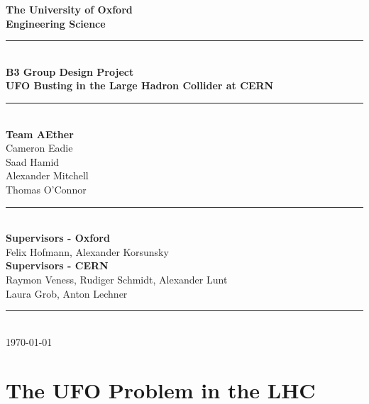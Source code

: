 \documentclass[a4paper,11pt]{report}
\begin{document}

\begin{titlepage}
\begin{center}
\vspace*{1cm}
\Large {\textbf{The University of Oxford}}\\
\Large{\textbf{Engineering Science}}\\
\vfill
\noindent\rule{5in}{0.6pt}\\[1mm]
\huge{\textbf{B3 Group Design Project}}\\[3mm]
\Large{\textbf{UFO Busting in the Large Hadron Collider at CERN}}\\[3mm]
\noindent\rule{5in}{0.6pt}\\[1mm]
\textbf{Team AEther}\\
Cameron Eadie\\Saad Hamid\\Alexander Mitchell\\Thomas O'Connor\\
\noindent\rule{5in}{0.6pt}\\[1mm]
\textbf{Supervisors - Oxford}\\
Felix Hofmann, Alexander Korsunsky\\
\textbf{Supervisors - CERN}\\
Raymon Veness, Rudiger Schmidt, Alexander Lunt\\
Laura Grob, Anton Lechner\\
\noindent\rule{5in}{0.6pt}\\[1mm]
\vfill
\today\\
\end{center}
\end{titlepage}

\begin{abstract}
\graphicspath{{./TomReport/}}

\end{abstract}

\thispagestyle{empty}
\tableofcontents

\chapter{The UFO Problem in the LHC}
\end{document}
